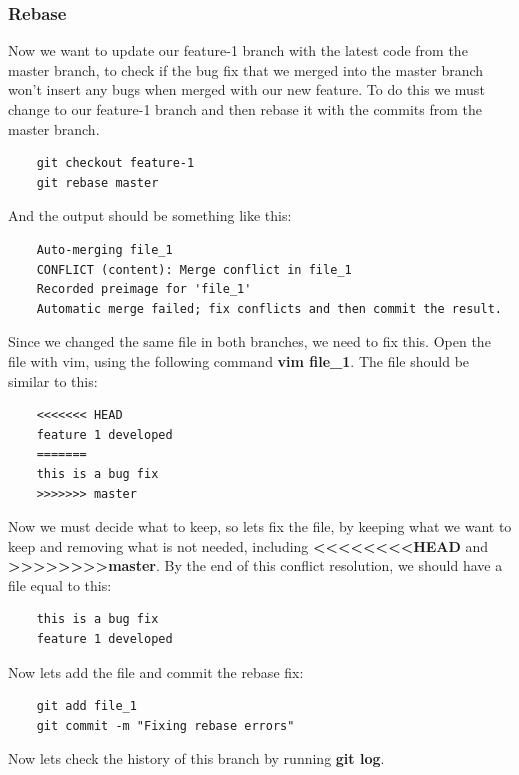 \documentclass{article}
\begin{document}
\subsubsection{Rebase}

Now we want to update our feature-1 branch with the latest code from the master branch, to check if the bug fix that we merged into the master branch won't insert any bugs when merged with our new feature. To do this we must change to our feature-1 branch and then rebase it with the commits from the master branch.

\begin{lstlisting}
	git checkout feature-1
	git rebase master
\end{lstlisting}

And the output should be something like this:

\begin{lstlisting}
	Auto-merging file_1
	CONFLICT (content): Merge conflict in file_1
	Recorded preimage for 'file_1'
	Automatic merge failed; fix conflicts and then commit the result.
\end{lstlisting}

Since we changed the same file in both branches, we need to fix this. Open the file with vim, using the following command \textbf{vim file\_1}. The file should be similar to this:

\begin{lstlisting}
	<<<<<<< HEAD
	feature 1 developed
	=======
	this is a bug fix
	>>>>>>> master
\end{lstlisting}

Now we must decide what to keep, so lets fix the file, by keeping what we want to keep and removing what is not needed, including \textbf{\textless\textless\textless\textless\textless\textless\textless\textless HEAD} and \textbf{\textgreater\textgreater\textgreater\textgreater\textgreater\textgreater\textgreater\textgreater master}. By the end of this conflict resolution, we should have a file equal to this:

\begin{lstlisting}
	this is a bug fix
	feature 1 developed
\end{lstlisting}

Now lets add the file and commit the rebase fix:

\begin{lstlisting}
	git add file_1
	git commit -m "Fixing rebase errors"
\end{lstlisting}

Now lets check the history of this branch by running \textbf{git log}.
\end{document}
